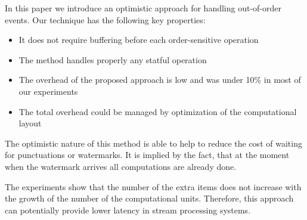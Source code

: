 
\label {fs-conclusion}

In this paper we introduce an optimistic approach for handling out-of-order events. Our technique has the following key properties:

\begin{itemize}
    \item It does not require buffering before each order-sensitive operation
    \item The method handles properly any statful operation
    \item The overhead of the proposed approach is low and was under 10\% in most of our experiments
    \item The total overhead could be managed by optimization of the computational layout
\end{itemize}

The optimistic nature of this method is able to help to reduce the cost of waiting for punctuations or watermarks. It is implied by the fact, that at the moment when the watermark arrives all computations are already done. 

The experiments show that the number of the extra items does not increase with the growth of the number of the computational units. Therefore, this approach can potentially provide lower latency in stream processing systems.
